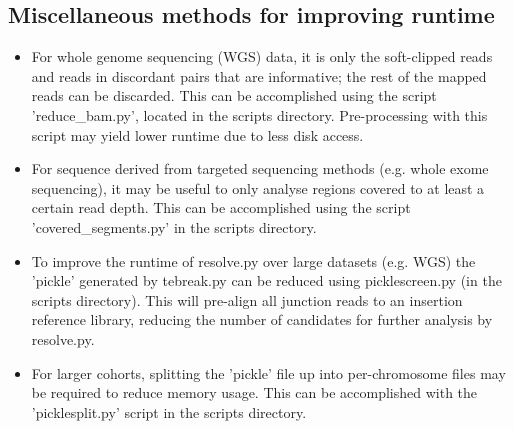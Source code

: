\documentclass[letterpaper,11pt]{article}
\begin{document}
\subsection{Miscellaneous methods for improving runtime}
\begin{itemize}
\item For whole genome sequencing (WGS) data, it is only the soft-clipped reads and reads in discordant pairs that are informative; the rest of the mapped reads can be discarded. This can be accomplished using the script 'reduce\_bam.py', located in the scripts directory. Pre-processing with this script may yield lower runtime due to less disk access.
\item For sequence derived from targeted sequencing methods (e.g. whole exome sequencing), it may be useful to only analyse regions covered to at least a certain read depth. This can be accomplished using the script 'covered\_segments.py' in the scripts directory.
\item To improve the runtime of resolve.py over large datasets (e.g. WGS) the 'pickle' generated by tebreak.py can be reduced using picklescreen.py (in the scripts directory). This will pre-align all junction reads to an insertion reference library, reducing the number of candidates for further analysis by resolve.py.
\item For larger cohorts, splitting the 'pickle' file up into per-chromosome files may be required to reduce memory usage. This can be accomplished with the 'picklesplit.py' script in the scripts directory.
\end{itemize}
\end{document}
